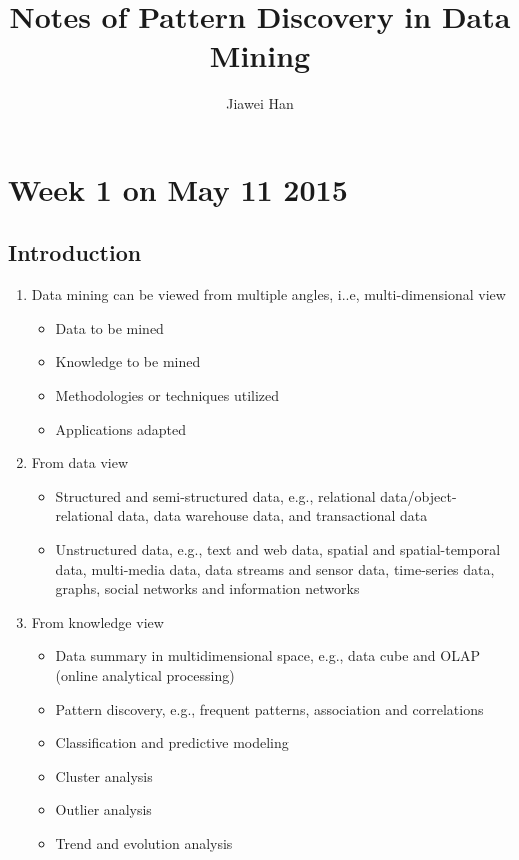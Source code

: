 \documentclass[12pt, a4paper]{article}
\begin{document}
\title{Notes of Pattern Discovery in Data Mining} 
\author{Jiawei Han}
\maketitle

\section{Week 1 on May 11 2015}

\subsection{Introduction}

\begin{enumerate}

\item Data mining can be viewed from multiple angles, i..e, multi-dimensional view
 \begin{itemize}
  \item Data to be mined
  \item Knowledge to be mined
  \item Methodologies or techniques utilized
  \item Applications adapted
 \end{itemize}

\item From data view
 \begin{itemize}
  \item Structured and semi-structured data, e.g., relational data/object-relational data, data warehouse data, and transactional data 
  \item Unstructured data, e.g., text and web data, spatial and spatial-temporal data, multi-media data, data streams and sensor data, time-series data, graphs, social networks and information networks
 \end{itemize}

\item From knowledge view
 \begin{itemize}
  \item Data summary in multidimensional space, e.g., data cube and OLAP (online analytical processing)
  \item Pattern discovery, e.g., frequent patterns, association and correlations
  \item Classification and predictive modeling
  \item Cluster analysis
  \item Outlier analysis
  \item Trend and evolution analysis
 \end{itemize}
 

\end{enumerate}
\end{document}
